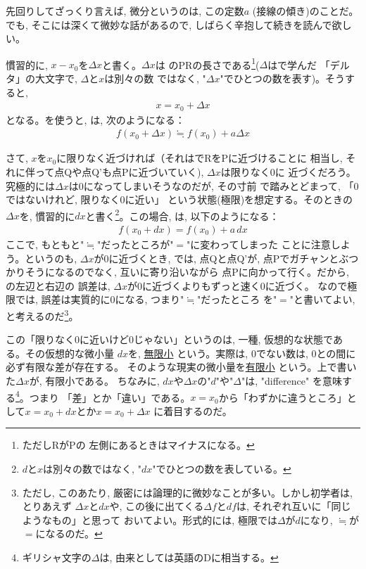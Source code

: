 先回りしてざっくり言えば, 微分というのは, この定数$a$
(接線の傾き)のことだ。でも, そこには深くて微妙な話があるので, 
しばらく辛抱して続きを読んで欲しい。

慣習的に, $x-x_0$を$\Delta x$と書く。$\Delta x$は
のPRの長さである\footnote{ただしRがPの
左側にあるときはマイナスになる。}($\Delta$はで学んだ
「デルタ」の大文字で, $\Delta$と$x$は別々の数
ではなく, "$\Delta x$"でひとつの数を表す)。そうすると, 
\begin{eqnarray}x=x_0+\Delta x\label{eq:define_dif_deltax}\end{eqnarray}
となる。を使うと, は, 次のようになる：
\begin{eqnarray}
f(x_0+\Delta x) \fallingdotseq f(x_0)+a\Delta x\label{eq:define_dif0001}
\end{eqnarray}

さて, $x$を$x_0$に限りなく近づければ（それはでRをPに近づけることに
相当し, それに伴って点Qや点Q'も点Pに近づいていく), $\Delta x$は限りなく0に
近づくだろう。究極的には$\Delta x$は0になってしまいそうなのだが, その寸前
で踏みとどまって, 「0ではないけれど, 限りなく0に近い」
という状態(極限)を想定する。そのときの$\Delta x$を, 
慣習的に$dx$と書く\footnote{$d$と$x$は別々の数ではなく, 
"$dx$"でひとつの数を表している。}。この場合, は, 以下のようになる：
\begin{eqnarray}
f(x_0+dx) = f(x_0)+a\,dx\label{eq:define_dif002}
\end{eqnarray}
ここで, もともと"$\fallingdotseq$"だったところが"$=$"に変わってしまった
ことに注意しよう。というのも, $\Delta x$が0に近づくとき, 
では, 点Qと点Q'が, 点Pでガチャンとぶつかりそうになるのでなく, 互いに寄り沿いながら
点Pに向かって行く。だから, の左辺と右辺の
誤差は, $\Delta x$が0に近づくよりもずっと速く0に近づく。
なので極限では, 誤差は実質的に0になる, つまり"$\fallingdotseq$"だったところ
を"$=$"と書いてよい, と考えるのだ\footnote{ただし, このあたり, 
厳密には論理的に微妙なことが多い。しかし初学者は, とりあえず
$\Delta x$と$dx$や, この後に出てくる$\Delta f$と$df$は, それぞれ互いに「同じようなもの」と思って
おいてよい。形式的には, 極限では$\Delta$が$d$になり, $\fallingdotseq$が$=$になるのだ。}。

この「限りなく0に近いけど0じゃない」というのは, 一種, 仮想的な状態である。その仮想的な微小量
$dx$を, \underline{無限小} 
という。実際は, 0でない数は, 0との間に必ず有限な差が存在する。
そのような現実の微小量を\underline{有限小}
という。上で書いた$\Delta x$が, 有限小である。
ちなみに, $dx$や$\Delta x$の"$d$"や"$\Delta$"は, "difference"
を意味する\footnote{ギリシャ文字の$\Delta$は, 由来としては英語のDに相当する。}。つまり
「差」とか「違い」である。$x=x_0$から「わずかに違うところ」として$x=x_0+dx$とか$x=x_0+\Delta x$
に着目するのだ。

